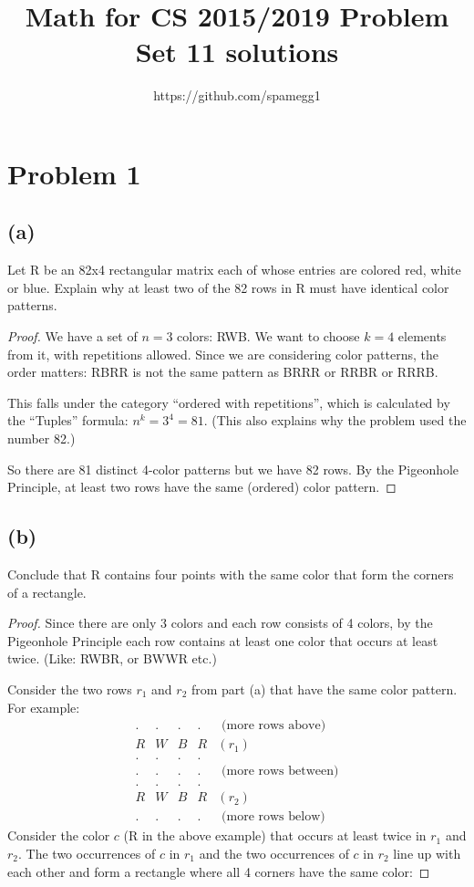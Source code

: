 \documentclass[14pt]{extarticle}
\title{Math for CS 2015/2019 Problem Set 11 solutions}
\author{https://github.com/spamegg1}
\begin{document}
\maketitle
\tableofcontents

\section{Problem 1}
\subsection{(a)}
Let R be an 82x4 rectangular matrix each of whose entries are colored red, white or blue. Explain why at least two of the 82 rows in R must have identical color patterns.
\begin{proof}
We have a set of $n = 3$ colors: RWB. We want to choose $k = 4$ elements from it, with repetitions allowed. Since we are considering color patterns, the order matters: RBRR is not the same pattern as BRRR or RRBR or RRRB.

This falls under the category ``ordered with repetitions'', which is calculated by the ``Tuples'' formula: $n^k = 3^4 = 81$. (This also explains why the problem used the number 82.)

So there are 81 distinct 4-color patterns but we have 82 rows. By the Pigeonhole Principle, at least two rows have the same (ordered) color pattern.
\end{proof}
\subsection{(b)}
Conclude that R contains four points with the same color that form the corners of a rectangle.
\begin{proof}
Since there are only 3 colors and each row consists of 4 colors, by the Pigeonhole Principle each row contains at least one color that occurs at least twice. (Like: RWBR, or BWWR etc.)

Consider the two rows $r_1$ and $r_2$ from part (a) that have the same color pattern. For example:
$$
\begin{array}{ccccc}
. & . & . & . & \text{ (more rows above)} \\
R & W & B & R & (r_1) \\
. & . & . & . & \\
. & . & . & . & \text{ (more rows between)} \\
. & . & . & . & \\
R & W & B & R & (r_2) \\
. & . & . & . & \text{ (more rows below)}
\end{array}
$$
Consider the color $c$ (R in the above example) that occurs at least twice in $r_1$ and $r_2$. The two occurrences of $c$ in $r_1$ and the two occurrences of $c$ in $r_2$ line up with each other and form a rectangle where all 4 corners have the same color:
\end{proof}
\end{document}
